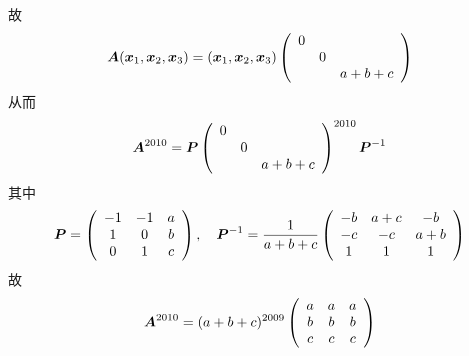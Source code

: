 \begin{frame}

故
$$
\boldsymbol{A}({\boldsymbol{x}}_1,{\boldsymbol{x}}_2,{\boldsymbol{x}}_3)=({\boldsymbol{x}}_1,{\boldsymbol{x}}_2,{\boldsymbol{x}}_3)\left(
\begin{array}{ccc}
0&&\\
&0&\\
&&a+b+c
\end{array}
\right)
$$
从而
$$
\boldsymbol{A}^{2010}=\boldsymbol{P}\left(
\begin{array}{ccc}
0&&\\
&0&\\
&&a+b+c
\end{array}
\right)^{2010}\boldsymbol{P}^{-1}
$$
其中
$$
\boldsymbol{P}=\left(
\begin{array}{ccc}
-1&-1&a\\
1&0&b\\
0&1&c
\end{array}
\right), \quad
\boldsymbol{P}^{-1}=\frac1{a+b+c}\left(
\begin{array}{ccc}
-b&a+c&-b\\
-c&-c&a+b\\
1&1&1
\end{array}
\right)
$$
故
$$
\boldsymbol{A}^{2010}= (a+b+c)^{2009}
\left(
\begin{array}{ccc}
a&a&a\\
b&b&b\\
c&c&c
\end{array}
\right)
$$

\end{frame}

